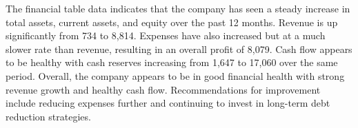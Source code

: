 

The financial table data indicates that the company has seen a steady increase in total assets, current assets, and equity over the past 12 months. Revenue is up significantly from 734 to 8,814. Expenses have also increased but at a much slower rate than revenue, resulting in an overall profit of 8,079. Cash flow appears to be healthy with cash reserves increasing from 1,647 to 17,060 over the same period. Overall, the company appears to be in good financial health with strong revenue growth and healthy cash flow. Recommendations for improvement include reducing expenses further and continuing to invest in long-term debt reduction strategies.